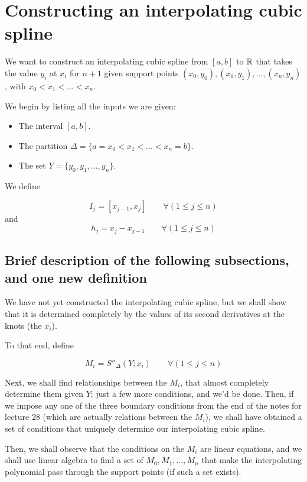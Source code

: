
\section{Constructing an interpolating cubic spline}

We want to construct an interpolating cubic spline from $[a, b]$ to $\mathbb{R}$ that takes the value $y_i$ at $x_i$ for $n+1$ given support points $(x_0, y_0), (x_1, y_1), \dots , (x_n, y_n)$, with $x_0 < x_1 < \dots < x_n$.

We begin by listing all the inputs we are given:
\begin{itemize}
\item
  The interval $[a, b]$.
\item
  The partition $\Delta = \{a = x_0 < x_1 < \dots < x_n = b \}$.
\item
  The set $Y = \{y_0, y_1, \dots , y_n \}$.
\end{itemize}

We define
\begin{defn}
  \[
    I_j = [x_{j-1}, x_j] \qquad \forall(1 \leq j \leq n)
  \]
  and
  \[
    h_j = x_j - x_{j-1} \qquad \forall(1 \leq j \leq n)
  \]
\end{defn}

\subsection{Brief description of the following subsections, and one new definition}
We have not yet constructed the interpolating cubic spline, but we shall show that it is determined completely by the values of its second derivatives at the knots (the $x_i$).

To that end, define
\begin{defn}
  \label{mar28:def:Mi}
  \[
    M_i = S''_\Delta(Y ; x_i) \qquad \forall(1 \leq j \leq n)
  \]
\end{defn}

 Next, we shall find relationships between the $M_i$, that almost completely determine them given $Y$; just a few more conditions, and we'd be done. Then, if we impose any one of the three boundary conditions from the end of the notes for lecture 28 (which are actually relations between the $M_i$), we shall have obtained a set of conditions that uniquely determine our interpolating cubic spline.

Then, we shall observe that the conditions on the $M_i$ are linear equations, and we shall use linear algebra to find a set of $M_0, M_1, \dots , M_n$ that make the interpolating polynomial pass through the support points (if such a set exists).

